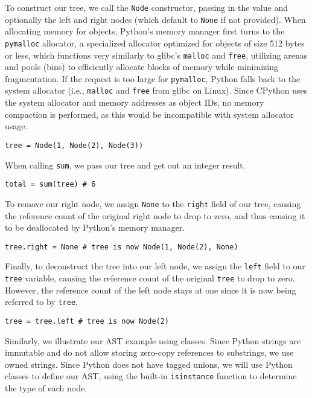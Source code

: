 \documentclass[12pt, letterpaper]{article}
\begin{document}
To construct our tree, we call the \texttt{Node} constructor, passing in the value and optionally the left and right nodes (which default to \texttt{None} if not provided). When allocating memory for objects, Python's memory manager first turns to the \texttt{pymalloc} allocator, a specialized allocator optimized for objects of size 512 bytes or less, which functions very similarly to glibc's \texttt{malloc} and \texttt{free}, utilizing arenas and pools (bins) to efficiently allocate blocks of memory while minimizing fragmentation. If the request is too large for \texttt{pymalloc}, Python falls back to the system allocator (i.e., \texttt{malloc} and \texttt{free} from glibc on Linux). Since CPython uses the system allocator and memory addresses as object IDs, no memory compaction is performed, as this would be incompatible with system allocator usage.\autocite{python-memory}
\begin{verbatim}
tree = Node(1, Node(2), Node(3))
\end{verbatim}
When calling \texttt{sum}, we pass our tree and get out an integer result.
\begin{verbatim}
total = sum(tree) # 6
\end{verbatim}
To remove our right node, we assign \texttt{None} to the \texttt{right} field of our tree, causing the reference count of the original right node to drop to zero, and thus causing it to be deallocated by Python's memory manager.
\begin{verbatim}
tree.right = None # tree is now Node(1, Node(2), None)
\end{verbatim}
Finally, to deconstruct the tree into our left node, we assign the \texttt{left} field to our \texttt{tree} variable, causing the reference count of the original \texttt{tree} to drop to zero. However, the reference count of the left node stays at one since it is now being referred to by \texttt{tree}.
\begin{verbatim}
tree = tree.left # tree is now Node(2)
\end{verbatim}

Similarly, we illustrate our AST example using classes. Since Python strings are immutable and do not allow storing zero-copy references to substrings, we use owned strings. Since Python does not have tagged unions, we will use Python classes to define our AST, using the built-in \texttt{isinstance} function to determine the type of each node.\autocite{python-classes}
\end{document}
